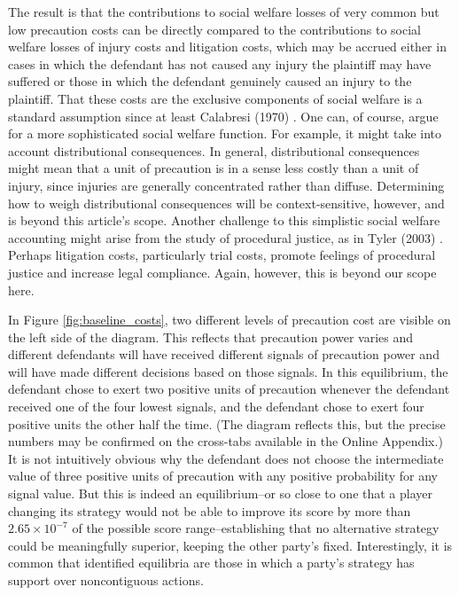 \documentclass{article}
\begin{document}
The result is that the contributions to social welfare losses of very common but low precaution costs can be directly compared to the contributions to social welfare losses of injury costs and litigation costs, which may be accrued either in cases in which the defendant has not caused any injury the plaintiff may have suffered or those in which the defendant genuinely caused an injury to the plaintiff. That these costs are the exclusive components of social welfare is a standard assumption since at least Calabresi (1970) \cite{calabresi}. One can, of course, argue for a more sophisticated social welfare function. For example, it might take into account distributional consequences. In general, distributional consequences might mean that a unit of precaution is in a sense less costly than a unit of injury, since injuries are generally concentrated rather than diffuse. Determining how to weigh distributional consequences will be context-sensitive, however, and is beyond this article's scope. Another challenge to this simplistic social welfare accounting might arise from the study of procedural justice, as in Tyler (2003) \cite{tyler}. Perhaps litigation costs, particularly trial costs, promote feelings of procedural justice and increase legal compliance. Again, however, this is beyond our scope here.


In Figure \ref{fig:baseline_costs}, two different levels of precaution cost are visible on the left side of the diagram. This reflects that precaution power varies and different defendants will have received different signals of precaution power and will have made different decisions based on those signals. In this equilibrium, the defendant chose to exert two positive units of precaution whenever the defendant received one of the four lowest signals, and the defendant chose to exert four positive units the other half the time. (The diagram reflects this, but the precise numbers may be confirmed on the cross-tabs available in the Online Appendix.) It is not intuitively obvious why the defendant does not choose the intermediate value of three positive units of precaution with any positive probability for any signal value. But this is indeed an equilibrium--or so close to one that a player changing its strategy would not be able to improve its score by more than $2.65 \times 10^{-7}$ of the possible score range--establishing that no alternative strategy could be meaningfully superior, keeping the other party's fixed. Interestingly, it is common that identified equilibria are those in which a party's strategy has support over noncontiguous actions.
\end{document}
